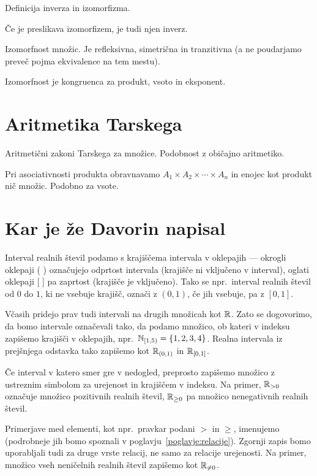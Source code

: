 Definicija inverza in izomorfizma.

Če je preslikava izomorfizem, je tudi njen inverz.

Izomorfnost množic. Je refleksivna, simetrična in tranzitivna (a ne poudarjamo preveč pojma ekvivalence na tem mestu).

Izomorfnost je kongruenca za produkt, vsoto in eksponent.

\section{Aritmetika Tarskega}
\label{sec:aritmetika-tarskega}

Aritmetični zakoni Tarskega za množice. Podobnost z običajno aritmetiko.

Pri asociativnosti produkta obravnavamo $A_1 \times A_2 \times \cdots \times A_n$ in
enojec kot produkt nič množic. Podobno za vsote.


\section{Kar je že Davorin napisal}

Interval realnih števil podamo s krajiščema intervala v oklepajih --- okrogli oklepaji ( ) označujejo odprtost intervala (krajišče ni vključeno v interval), oglati oklepaji [ ] pa zaprtost (krajišče je vključeno). Tako se npr.~interval realnih števil od $0$ do $1$, ki ne vsebuje krajišč, označi z $(0, 1)$, če jih vsebuje, pa z $[0, 1]$.

Včasih pridejo prav tudi intervali na drugih množicah kot $\mathbb{R}$. Zato se dogovorimo, da bomo intervale označevali tako, da podamo množico, ob kateri v indeksu zapišemo krajišči v oklepajih, npr.~$\intco[\NN]{1}{5} = \set{1, 2, 3, 4}$. Realna intervala iz prejšnjega odstavka tako zapišemo kot ${\mathbb{R}}_{(0, 1)}$ in ${\mathbb{R}}_{[0, 1]}$.

Če interval v katero smer gre v nedogled, preprosto zapišemo množico z ustreznim simbolom za urejenost in krajiščem v indeksu. Na primer, $\mathbb{R}_{> 0}$ označuje množico pozitivnih realnih števil, $\mathbb{R}_{\geq 0}$ pa množico nenegativnih realnih števil.

Primerjave med elementi, kot npr.~pravkar podani $>$ in $\geq$, imenujemo  (podrobneje jih bomo spoznali v poglavju~\ref{poglavje:relacije}). Zgornji zapis bomo uporabljali tudi za druge vrste relacij, ne samo za relacije urejenosti. Na primer, množico vseh neničelnih realnih števil zapišemo kot $\mathbb{R}_{\neq 0}$.

